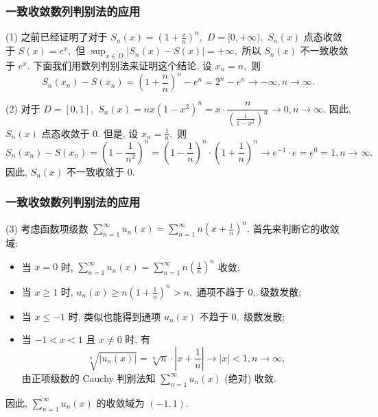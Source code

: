 
\begin{frame}
\frametitle{一致收敛数列判别法的应用}

(1) 之前已经证明了对于 $S_n(x) = \left( 1 + \frac{x}{n} \right)^n,$ $D = [0, +\infty),$ $S_n(x)$ 点态收敛于 $S(x) = e^x,$ 但 $\sup_{x \in D} |S_n(x) - S(x)| = +\infty,$ 所以 $S_n(x)$ 不一致收敛于 $e^x.$ 下面我们用数列判别法来证明这个结论.
\pause
设 $x_n = n,$ 则
\[
S_n(x_n) - S(x_n) = \left( 1 + \frac{n}{n} \right)^n - e^n = 2^n - e^n \to -\infty, n \to \infty.
\]

\pause
\vspace{1em}

(2) 对于 $D = [0, 1],$ $S_n(x) = nx(1-x^2)^n = x \cdot \dfrac{n}{\left( \frac{1}{1-x^2} \right)^n} \to 0, n \to \infty.$ 因此, $S_n(x)$ 点态收敛于 $0.$
\pause
但是, 设 $x_n = \frac{1}{n},$ 则
\[
S_n(x_n) - S(x_n) = \left( 1 - \frac{1}{n^2} \right)^n = \left( 1 - \frac{1}{n} \right)^n \cdot \left( 1 + \frac{1}{n} \right)^n \to e^{-1} \cdot e = e^0 = 1, n \to \infty.
\]
因此, $S_n(x)$ 不一致收敛于 $0.$

\end{frame}


\begin{frame}
\frametitle{一致收敛数列判别法的应用}

(3) 考虑函数项级数 $\sum_{n=1}^\infty u_n(x) = \sum_{n=1}^\infty n \left( x + \frac{1}{n} \right)^n.$
\pause
首先来判断它的收敛域:
\begin{itemize}
\item 当 $x = 0$ 时, $\sum_{n=1}^\infty u_n(x) = \sum_{n=1}^\infty n \left( \frac{1}{n} \right)^n$ 收敛;
\pause
\item 当 $x \geqslant 1$ 时, $u_n(x) \geqslant n \left( 1 + \frac{1}{n} \right)^n > n,$ 通项不趋于 $0,$ 级数发散;
\pause
\item 当 $x \leqslant -1$ 时, 类似也能得到通项 $u_n(x)$ 不趋于 $0,$ 级数发散;
\pause
\item 当 $-1 < x < 1$ 且 $x \neq 0$ 时, 有
\[
\sqrt[n]{|u_n(x)|} = \sqrt[n]{n} \cdot \left| x + \frac{1}{n} \right| \to |x| < 1, n \to \infty,
\]
由正项级数的 Cauchy 判别法知 $\sum_{n=1}^\infty u_n(x)$ (绝对) 收敛.
\end{itemize}
因此, $\sum_{n=1}^\infty u_n(x)$ 的收敛域为 $(-1, 1).$

\end{frame}

